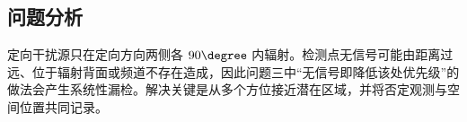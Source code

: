 \subsection{问题分析}

定向干扰源只在定向方向两侧各 \(90\degree\) 内辐射。检测点无信号可能由距离过远、位于辐射背面或频道不存在造成，因此问题三中“无信号即降低该处优先级”的做法会产生系统性漏检。解决关键是从多个方位接近潜在区域，并将否定观测与空间位置共同记录。
